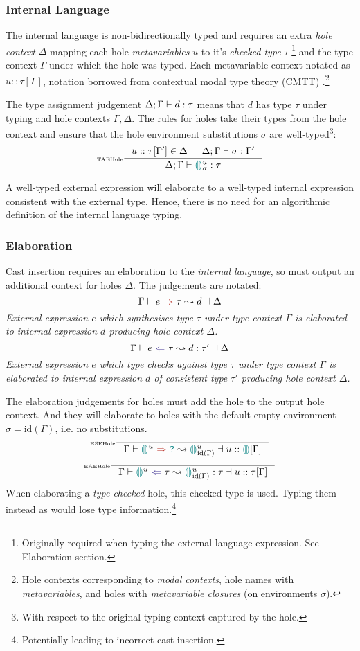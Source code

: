 \subsubsection{Internal Language}\label{sec:HazelInternalLang}
The internal language is non-bidirectionally typed and requires an extra \textit{hole context} $\Delta$ mapping each hole \textit{metavariables} $u$ to it's \textit{checked type} $\tau$ \footnote{Originally required when typing the external language expression. See Elaboration section.} and the type context $\Gamma$ under which the hole was typed. Each metavariable context notated as $u :: \tau[\Gamma]$, notation borrowed from contextual modal type theory (CMTT) \cite{CMTT}.\footnote{Hole contexts corresponding to \textit{modal contexts}, hole names with \textit{metavariables}, and holes with \textit{metavariable closures} (on environments $\sigma$).} 

The type assignment judgement $\Delta;\Gamma \vdash d : \tau$ means that $d$ has type $\tau$ under typing and hole contexts $\Gamma, \Delta$. The rules for holes take their types from the hole context and ensure that the hole environment substitutions $\sigma$ are well-typed\footnote{With respect to the original typing context captured by the hole.}:
\[\inference[\tiny TAEHole]{u :: \tau[\Gamma'] \in \Delta & \typeassignment{\sigma}{\Gamma'}}{\typeassignment{\hole^u_\sigma}{\tau}}\]

A well-typed external expression will elaborate to a well-typed internal expression consistent with the external type. Hence, there is no need for an algorithmic definition of the internal language typing.

\subsubsection{Elaboration}\label{sec:HazelElaboration}
Cast insertion requires an elaboration to the \textit{internal language}, so must output an additional context for holes $\Delta$. The judgements are notated: \[\elaborationSynthesis{e}{\tau}{d}{\Delta}\]
\textit{
External expression $e$ which synthesises type $\tau$ under type context $\Gamma$ is elaborated to internal expression $d$ producing hole context $\Delta$. }
\[\elaborationAnalysis{e}{\tau}{d}{\tau'}{\Delta}\]
\textit{
External expression $e$ which type checks against type $\tau$ under type context $\Gamma$ is elaborated to internal expression $d$ of consistent type $\tau'$ producing hole context $\Delta$.}

The elaboration judgements for holes must add the hole to the output hole context. And they will elaborate to holes with the default empty environment $\sigma = \mathrm{id}(\Gamma)$, i.e. no substitutions.
\[\inference[\tiny ESEHole]{}{\elaborationSynthesis{\hole^u}{\dyn}{\hole^u_{\mathrm{id}(\Gamma)}}{u :: \hole[] [\Gamma]}}\]
\[\inference[\tiny EAEHole]{}{\elaborationAnalysis{\hole^u}{\tau}{\hole^u_{\mathrm{id}(\Gamma)}}{\tau}{u::\tau[\Gamma]}}\]
When elaborating a \textit{type checked} hole, this checked type is used. Typing them instead as {\dyn} would lose type information.\footnote{Potentially leading to incorrect cast insertion.}

